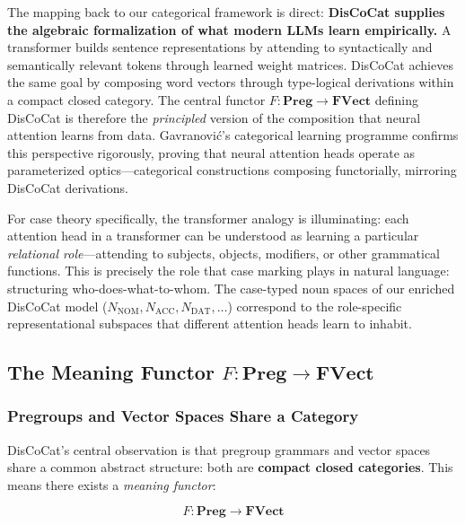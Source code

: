 \documentclass[
]{article}
\begin{document}
The mapping back to our categorical framework is direct:
\textbf{DisCoCat supplies the algebraic formalization of what modern
LLMs learn empirically.} A transformer builds sentence representations
by attending to syntactically and semantically relevant tokens through
learned weight matrices. DisCoCat achieves the same goal by composing
word vectors through type-logical derivations within a compact closed
category. The central functor \(F: \mathbf{Preg} \to \mathbf{FVect}\)
defining DisCoCat is therefore the \emph{principled} version of the
composition that neural attention learns from data. Gavranović's
\citeyearpar{gavranovic2024thesis} categorical learning programme
confirms this perspective rigorously, proving that neural attention
heads operate as parameterized optics---categorical constructions
composing functorially, mirroring DisCoCat derivations.

For case theory specifically, the transformer analogy is illuminating:
each attention head in a transformer can be understood as learning a
particular \emph{relational role}---attending to subjects, objects,
modifiers, or other grammatical functions. This is precisely the role
that case marking plays in natural language: structuring
who-does-what-to-whom. The case-typed noun spaces of our enriched
DisCoCat model
(\(N_{\text{NOM}}, N_{\text{ACC}}, N_{\text{DAT}}, \ldots\)) correspond
to the role-specific representational subspaces that different attention
heads learn to inhabit.

\subsection{\texorpdfstring{The Meaning Functor
\(F: \mathbf{Preg} \to \mathbf{FVect}\)}{The Meaning Functor F: \textbackslash mathbf\{Preg\} \textbackslash to \textbackslash mathbf\{FVect\}}}\label{sec:discocat-meaning-functor}

\subsubsection{Pregroups and Vector Spaces Share a
Category}\label{pregroups-and-vector-spaces-share-a-category}

DisCoCat's central observation is that pregroup grammars and vector
spaces share a common abstract structure: both are \textbf{compact
closed categories}. This means there exists a \emph{meaning functor}:

\begin{equation}
F: \mathbf{Preg} \to \mathbf{FVect}
\label{eq:eq-4-1}
\end{equation}
\end{document}
